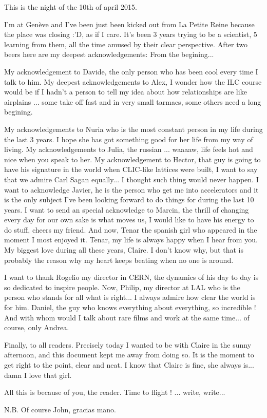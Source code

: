 \vfill
This is the night of the 10th of april 2015.\par
I'm at Gen\`eve and I've been just been kicked out from La Petite Reine because the place was closing :'D, as if I care. It's been 3 years trying to be a scientist, 5 learning from them, all the time amused by their clear perspective. After two beers here are my deepest acknowledgements: From the begining...\par
My acknowledgement to Davide, the only person who has been cool every time I talk to him. My deepest acknowledgements to Alex, I wonder how the ILC course would be if I hadn't a person to tell my idea about how relationships are like airplains ... some take off fast and in very small tarmacs, some others need a long begining.\par
My acknowledgements to Nuria who is the most constant person in my life during the last 3 years. I hope she has got something good for her life from my way of living. My acknowledgements to Julia, the russian ... waaaaw, life feels hot and nice when you speak to her. My acknowledgement to Hector, that guy is going to have his signature in the world when CLIC-like lattices were built, I want to say that we admire Carl Sagan equally... I thought such thing would never happen. I want to acknowledge Javier, he is the person who get me into accelerators and it is the only subject I've been looking forward to do things for during the last 10 years. I want to send an special acknowledge to Marcin, the thrill of changing every day for our own sake is what moves us, I would like to have his energy to do stuff, cheers my friend. And now, Tenar the spanish girl who appeared in the moment I most enjoyed it. Tenar, my life is always happy when I hear from you. My biggest love during all these years, Claire. I don't 
know why, but that is probably the reason why my heart keeps beating when no one is around.\par
I want to thank Rogelio my director in CERN, the dynamics of his day to day is so dedicated to inspire people. Now, Philip, my director at LAL who is the person who stands for all what is right... I always admire how clear the world is for him. Daniel, the guy who knows everything about everything, so incredible ! And with whom would I talk about rare films and work at the same time... of course, only Andrea.\par
Finally, to all readers. Precisely today I wanted to be with Claire in the sunny afternoon, and this document kept me away from doing so. It is the moment to get right to the point, clear and neat. I know that Claire is fine, she always is... damn I love that girl.\par
All this is because of you, the reader. Time to flight ! ... write, write...\par
N.B. Of course John, gracias mano.
\vfill